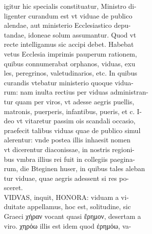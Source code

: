 \documentclass{article}
\begin{document}
\begin{pages}
                igitur hic specialis constituatur, Ministro di- \\
                ligenter curandum est vt viduae de publico \\
                alendae, aut ministerio Ecclesiastico depu- \\
                tandae, idoneae solum assumantur. Quod vt \\
                recte intelligamus sic accipi debet. Habebat \\
                vetus Ecclesia imprimis pauperum rationem, \\
                quibus connumerabat orphanos, viduas, exu \\
                les, peregrinos, valetudinarios, etc. In quibus \\
                curandis vtebatur ministerio quoque vidua- \\
                rum: nam inulta rectius per viduas administran- \\
                tur quam per viros, vt adesse aegris puellis, \\
                matronis, puerperis, infantibus, pueris, et c. I- \\
                deo vt vitaretur passim ois scandali occasio, \\
                praefecit talibus viduas quae de publico simul \\
                alerentur: vnde postea illis inhaesit nomen \\
                vt dicerentur diaconissae, in nostris regioni- \\
                bus vmbra illius rei fuit in collegiis paegina- \\
                rum, die Bteginen huser, in quibus tales aleban \\
                tur viduae, quae aegris adessent si res po- \\
                sceret. \\
                VIDVAS, inquit, HONORA: viduam a vi- \\
                duitate appellamus, hoc est, solitudine, sic \\
                Graeci χήραν vocant quasi ἔρημον, desertam a \\
                viro. χηρόω illis est idem quod ἐρημόω, va- \\

\end{pages}
\end{document}
